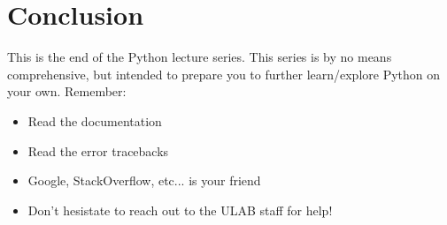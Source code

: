 \documentclass[12pt]{article}
\numberwithin{equation}{section}
\begin{document}
\section{Conclusion}
This is the end of the Python lecture series. This series is by no means comprehensive, but intended to prepare you to further learn/explore Python on your own. Remember:
\begin{itemize}
    \item Read the documentation
    \item Read the error tracebacks
    \item Google, StackOverflow, etc... is your friend
    \item Don't hesistate to reach out to the ULAB staff for help!
\end{itemize}
\end{document}
